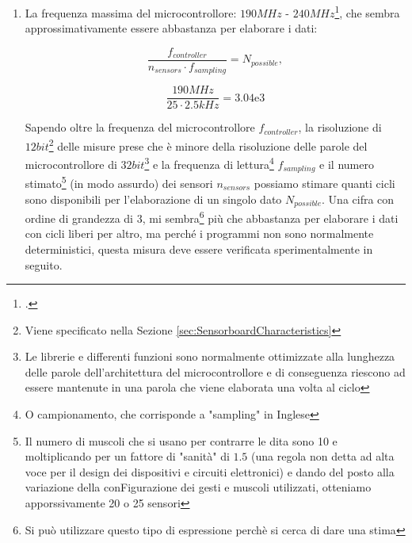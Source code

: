 \documentclass[a4paper, 10pt, final]{article} %
\begin{document}
    \begin{enumerate}[label=\emph{(\arabic*)}]
        \item La frequenza massima del microcontrollore: $190MHz$ - $240MHz$\footcite[Sezione 1.4.1]{ESP32:Datasheet}, che sembra approssimativamente essere abbastanza per elaborare i dati:
            \begin{figure}[H]
                \centering
                \begin{minipage}[b]{.35\linewidth}
                    \centering
                    \[
                        \frac{f_{controller}}{n_{sensors} \cdot f_{sampling}} = N_{possible} \mathrm{,}
                    \]
                \end{minipage}
                \begin{minipage}[b]{.35\linewidth}
                    \centering
                    \[
                        \frac{190MHz}{25 \cdot 2.5kHz} = 3.04\mathrm{e}3
                    \]
                \end{minipage}
            \end{figure}
            \noindent Sapendo oltre la frequenza del microcontrollore $f_{controller}$, la risoluzione di $12bit$\footnote{Viene specificato nella Sezione \ref{sec:SensorboardCharacteristics}} delle misure prese che \`{e} minore della risoluzione delle parole del microcontrollore di $32bit$\footnote{Le librerie e differenti funzioni sono normalmente ottimizzate alla lunghezza delle parole dell'architettura del microcontrollore e di conseguenza riescono ad essere mantenute in una parola che viene elaborata una volta al ciclo} e la frequenza di lettura\footnote{O campionamento, che corrisponde a "sampling" in Inglese} $f_{sampling}$ e il numero stimato\footnote{Il numero di muscoli che si usano per contrarre le dita sono 10 e moltiplicando per un fattore di "sanit\`{a}" di $1.5$ (una regola non detta ad alta voce per il design dei dispositivi e circuiti elettronici) e dando del posto alla variazione della conFigurazione dei gesti e muscoli utilizzati, otteniamo apporssivamente 20 o 25 sensori} (in modo assurdo) dei sensori $n_{sensors}$ possiamo stimare quanti cicli sono disponibili per l'elaborazione di un singolo dato $N_{possible}$.
            Una cifra con ordine di grandezza di $3$, mi sembra\footnote{Si pu\`{o} utilizzare questo tipo di espressione perch\`{e} si cerca di dare una stima} pi\`{u} che abbastanza per elaborare i dati con cicli liberi per altro, ma perch\'{e} i programmi non sono normalmente deterministici, questa misura deve essere verificata sperimentalmente in seguito.

\end{enumerate}
\end{document}
